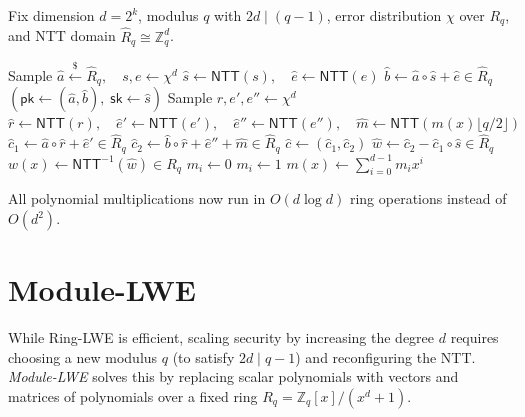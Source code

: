 \begin{definition}\label{def:ntt-ring-lwe-pke}
    Fix dimension \(d = 2^k\), modulus \(q\) with \(2d \mid (q - 1)\), error distribution \(\chi\) over \(R_q\), and NTT domain \(\hat{R}_q \cong \mathbb{Z}_q^d\).
    \begin{algorithmic}[1]
            \State Sample \(\hat{a} \xleftarrow{\$} \hat{R}_q, \quad s, e \leftarrow \chi^d\)
            \State \(\hat{s} \gets \mathsf{NTT}(s), \quad \hat{e} \gets \mathsf{NTT}(e)\)
            \State \(\hat{b} \gets \hat{a} \circ \hat{s} + \hat{e} \in \hat{R}_q\)
            \State \Return \((\mathsf{pk} \gets (\hat{a}, \hat{b}), \; \mathsf{sk} \gets \hat{s})\)
        \EndProcedure
        \Statex
            \State Sample \(r, e', e'' \leftarrow \chi^d\)
            \State \(\hat{r} \gets \mathsf{NTT}(r), \quad \hat{e}' \gets \mathsf{NTT}(e'), \quad \hat{e}'' \gets \mathsf{NTT}(e''), \quad \hat{m} \gets \mathsf{NTT}(m(x) \lfloor q/2 \rfloor)\)
            \State \(\hat{c}_1 \gets \hat{a} \circ \hat{r} + \hat{e}' \in \hat{R}_q\)
            \State \(\hat{c}_2 \gets \hat{b} \circ \hat{r} + \hat{e}'' + \hat{m} \in \hat{R}_q\)
            \State \Return \(\hat{c} \gets (\hat{c}_1, \hat{c}_2)\)
        \EndProcedure
        \Statex
            \State \(\hat{w} \gets \hat{c}_2 - \hat{c}_1 \circ \hat{s} \in \hat{R}_q\)
            \State \(w(x) \gets \mathsf{NTT}^{-1}(\hat{w}) \in R_q\)
                    \State \(m_i \gets 0\)
                \Else
                    \State \(m_i \gets 1\)
                \EndIf
            \EndFor
            \State \Return \(m(x) \gets \sum_{i=0}^{d-1} m_i x^i\)
        \EndProcedure
    \end{algorithmic}
\end{definition}
All polynomial multiplications now run in \(O(d \log d)\) ring operations instead of \(O(d^2)\).

\section*{Module-LWE}

While Ring-LWE is efficient, scaling security by increasing the degree \(d\) requires choosing a new modulus \(q\) (to satisfy \(2d \mid q - 1\)) and reconfiguring the NTT.
\emph{Module-LWE} solves this by replacing scalar polynomials with vectors and matrices of polynomials over a fixed ring \(R_q = \mathbb{Z}_q[x] / (x^d + 1)\).

